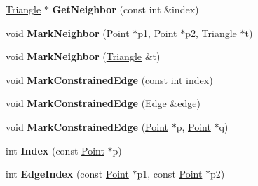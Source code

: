 \begin{DoxyCompactItemize}
\item 
\hypertarget{classp2t_1_1_triangle_a50cccd0cddea67325756fca9b793c38d}{\hyperlink{classp2t_1_1_triangle}{Triangle} $\ast$ {\bfseries Get\+Neighbor} (const int \&index)}\label{classp2t_1_1_triangle_a50cccd0cddea67325756fca9b793c38d}

\item 
\hypertarget{classp2t_1_1_triangle_a9164f8f3212ef95a6da9015d73dd41bd}{void {\bfseries Mark\+Neighbor} (\hyperlink{structp2t_1_1_point}{Point} $\ast$p1, \hyperlink{structp2t_1_1_point}{Point} $\ast$p2, \hyperlink{classp2t_1_1_triangle}{Triangle} $\ast$t)}\label{classp2t_1_1_triangle_a9164f8f3212ef95a6da9015d73dd41bd}

\item 
\hypertarget{classp2t_1_1_triangle_af34b61f225778d880b20f95aaacd59ae}{void {\bfseries Mark\+Neighbor} (\hyperlink{classp2t_1_1_triangle}{Triangle} \&t)}\label{classp2t_1_1_triangle_af34b61f225778d880b20f95aaacd59ae}

\item 
\hypertarget{classp2t_1_1_triangle_a724ffa66356bfbbf5b3e603aa5302921}{void {\bfseries Mark\+Constrained\+Edge} (const int index)}\label{classp2t_1_1_triangle_a724ffa66356bfbbf5b3e603aa5302921}

\item 
\hypertarget{classp2t_1_1_triangle_a0787666cf3b3ddfa20670d4d9db911e6}{void {\bfseries Mark\+Constrained\+Edge} (\hyperlink{structp2t_1_1_edge}{Edge} \&edge)}\label{classp2t_1_1_triangle_a0787666cf3b3ddfa20670d4d9db911e6}

\item 
\hypertarget{classp2t_1_1_triangle_ab7473df18094a9e777c5c1e04792f71d}{void {\bfseries Mark\+Constrained\+Edge} (\hyperlink{structp2t_1_1_point}{Point} $\ast$p, \hyperlink{structp2t_1_1_point}{Point} $\ast$q)}\label{classp2t_1_1_triangle_ab7473df18094a9e777c5c1e04792f71d}

\item 
\hypertarget{classp2t_1_1_triangle_a2728c35a436784a2f8919f58c2593f6d}{int {\bfseries Index} (const \hyperlink{structp2t_1_1_point}{Point} $\ast$p)}\label{classp2t_1_1_triangle_a2728c35a436784a2f8919f58c2593f6d}

\item 
\hypertarget{classp2t_1_1_triangle_a5322a27e9794fff7fefe904593bc5772}{int {\bfseries Edge\+Index} (const \hyperlink{structp2t_1_1_point}{Point} $\ast$p1, const \hyperlink{structp2t_1_1_point}{Point} $\ast$p2)}\label{classp2t_1_1_triangle_a5322a27e9794fff7fefe904593bc5772}


\end{DoxyCompactItemize}

